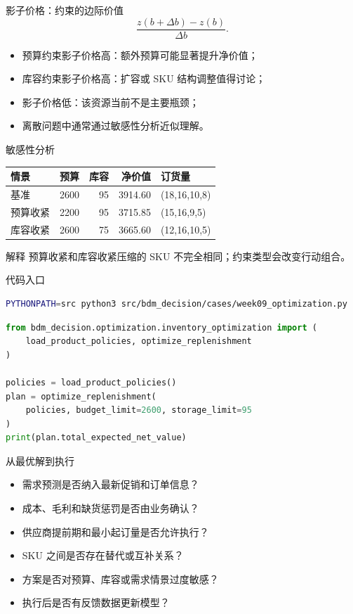 \documentclass[UTF8,fontset=fandol,aspectratio=169,11pt]{ctexbeamer}
\begin{document}
\begin{frame}{影子价格：约束的边际价值}
\[
  \frac{z(b+\Delta b)-z(b)}{\Delta b}.
\]
\begin{itemize}
  \item 预算约束影子价格高：额外预算可能显著提升净价值；
  \item 库容约束影子价格高：扩容或 SKU 结构调整值得讨论；
  \item 影子价格低：该资源当前不是主要瓶颈；
  \item 离散问题中通常通过敏感性分析近似理解。
\end{itemize}
\end{frame}

\begin{frame}{敏感性分析}
\begin{center}
\begin{tabular}{lrrrl}
\toprule
情景 & 预算 & 库容 & 净价值 & 订货量\\
\midrule
基准 & 2600 & 95 & 3914.60 & (18,16,10,8)\\
预算收紧 & 2200 & 95 & 3715.85 & (15,16,9,5)\\
库容收紧 & 2600 & 75 & 3665.60 & (12,16,10,5)\\
\bottomrule
\end{tabular}
\end{center}
\begin{block}{解释}
预算收紧和库容收紧压缩的 SKU 不完全相同；约束类型会改变行动组合。
\end{block}
\end{frame}

\begin{frame}[fragile]{代码入口}
\begin{lstlisting}[language=bash]
PYTHONPATH=src python3 src/bdm_decision/cases/week09_optimization.py
\end{lstlisting}

\begin{lstlisting}[language=Python]
from bdm_decision.optimization.inventory_optimization import (
    load_product_policies, optimize_replenishment
)

policies = load_product_policies()
plan = optimize_replenishment(
    policies, budget_limit=2600, storage_limit=95
)
print(plan.total_expected_net_value)
\end{lstlisting}
\end{frame}

\begin{frame}{从最优解到执行}
\begin{itemize}
  \item 需求预测是否纳入最新促销和订单信息？
  \item 成本、毛利和缺货惩罚是否由业务确认？
  \item 供应商提前期和最小起订量是否允许执行？
  \item SKU 之间是否存在替代或互补关系？
  \item 方案是否对预算、库容或需求情景过度敏感？
  \item 执行后是否有反馈数据更新模型？
\end{itemize}
\end{frame}
\end{document}
